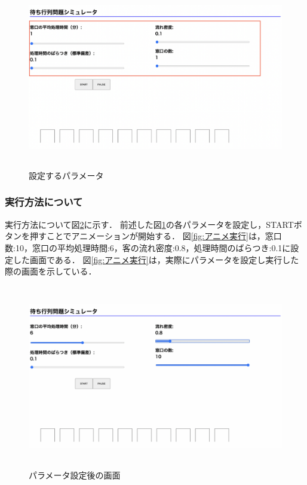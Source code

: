 \documentclass[12pt,a4j]{ltjsarticle}
\begin{document}
\begin{figure}[h]
\begin{center}
\includegraphics[height = 80mm ] {figures/lay_op.pdf}
\caption{設定するパラメータ}
\label{fig:layout_ex}
\end{center}
\end{figure}

\clearpage

\subsubsection{実行方法について}
実行方法について図\ref{fig:設定}に示す．
前述した図\ref{fig:layout_ex}の各パラメータを設定し，STARTボタンを押すことでアニメーションが開始する．
図\ref{fig:アニメ実行}は，窓口数:10，窓口の平均処理時間:6，客の流れ密度:0.8，処理時間のばらつき:0.1に設定した画面である．
図\ref{fig:アニメ実行}は，実際にパラメータを設定し実行した際の画面を示している．
\begin{figure}[h]
\begin{center}
\includegraphics[height = 80mm ] {figures/lay_para.pdf}
\caption{パラメータ設定後の画面}
\label{fig:設定}
\end{center}
\end{figure}
\end{document}
